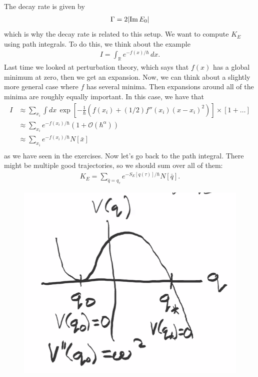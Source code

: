 \documentclass{book}
\theoremstyle{definition}
\newcommand{\R}{\mathbb{R}}
\newcommand{\nn}{\nonumber}
\newcommand{\al}{\alpha}
\newcommand{\f}[2]{\frac{#1}{#2}}
\newcommand{\lp}{\left(}
\newcommand{\rp}{\right)}
\newcommand{\lb}{\left[}
\newcommand{\rb}{\right]}
\begin{document}
The decay rate is given by
\begin{align}
\Gamma = 2\abs{\Im E_0}
\end{align}
which is why the decay rate is related to this setup. We want to compute $K_E$ using path integrals. To do this, we think about the example
\begin{align}
I = \int_\R e^{-f(x)/\hbar}\,dx.
\end{align}
Last time we looked at perturbation theory, which says that $f(x)$ has a global minimum at zero, then we get an expansion. Now, we can think about a slightly more general case where $f$ has several minima. Then expansions around all of the minima are roughly equally important. In this case, we have that 
\begin{align}
I &\approx \sum_{x_i} \int dx\, \exp\lb -\f{1}{\hbar}\lp f(x_i) + (1/2)f''(x_i) (x-x_i)^2 \rp \rb \times\lb 1+ \dots \rb \nn\\
&\approx \sum_{x_i}e^{-f(x_i)/\hbar}(1+ \mathcal{O}(\hbar^\al))\nn\\
&\approx \sum_{x_i}e^{-f(x_i)/\hbar}N[\bar{x}]\nn\\
\end{align}
as we have seen in the exercises. Now let's go back to the path integral. There might be multiple good trajectories, so we should sum over all of them:
\begin{align}
K_E = \sum_{\bar{q} = q_c} e^{-S_E[q(\tau)]/\hbar} N[\bar{q}] .
\end{align}
\begin{figure}[!htb]
	\centering
	\includegraphics[scale=0.3]{meta}
\end{figure}
\end{document}
